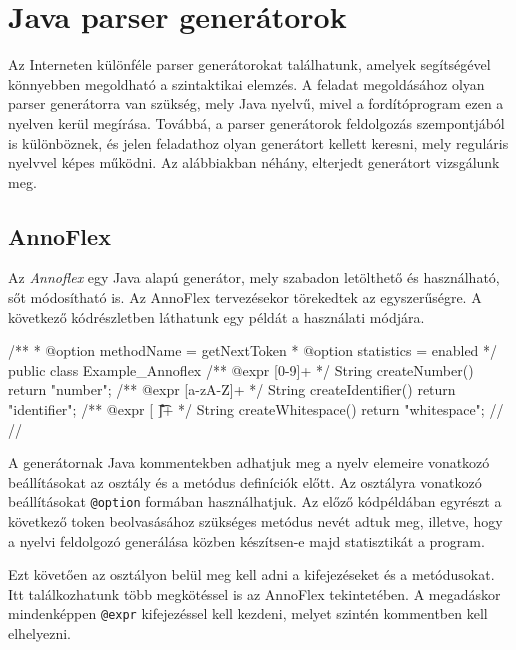 


\section{Java parser generátorok}

Az Interneten különféle parser generátorokat találhatunk, amelyek segítségével könnyebben megoldható a szintaktikai elemzés.
A feladat megoldásához olyan parser generátorra van szükség, mely Java nyelvű, mivel a fordítóprogram ezen a nyelven kerül megírása.
Továbbá, a parser generátorok feldolgozás szempontjából is különböznek, és jelen feladathoz olyan generátort kellett keresni, mely reguláris nyelvvel képes működni.
Az alábbiakban néhány, elterjedt generátort vizsgálunk meg.

\subsection{AnnoFlex}

Az \textit{Annoflex} egy Java alapú generátor, mely szabadon letölthető és használható, sőt módosítható is.
Az AnnoFlex tervezésekor törekedtek az egyszerűségre. A következő kódrészletben láthatunk egy példát a használati módjára.
\begin{java}
/**
* @option methodName = getNextToken
* @option statistics = enabled
*/
public class Example_Annoflex {
/** @expr [0-9]+       */ String createNumber()     { return "number"; }
/** @expr [a-zA-Z]+    */ String createIdentifier() { return "identifier"; }
/** @expr [ \n\r\t\f]+ */ String createWhitespace() { return "whitespace"; }
//%
//%
}
\end{java}

A generátornak Java kommentekben adhatjuk meg a nyelv elemeire vonatkozó beállításokat az osztály és a metódus definíciók előtt. Az osztályra vonatkozó beállításokat \texttt{@option} formában használhatjuk. Az előző kódpéldában egyrészt a következő token beolvasásához szükséges metódus nevét adtuk meg, illetve, hogy a nyelvi feldolgozó generálása közben készítsen-e majd statisztikát a program.

Ezt követően az osztályon belül meg kell adni a kifejezéseket és a metódusokat. Itt találkozhatunk több megkötéssel is az AnnoFlex tekintetében. A megadáskor mindenképpen \texttt{@expr} kifejezéssel kell kezdeni, melyet szintén kommentben kell elhelyezni.

